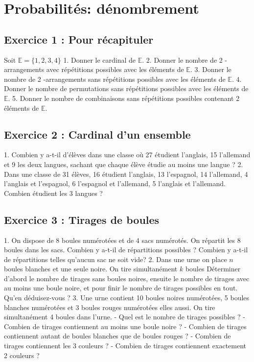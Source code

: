 \chapter{Probabilités: dénombrement}

\section*{Exercice 1 : Pour récapituler}

Soit \(\mathbb{E}=\{1,2,3,4\}\)
1. Donner le cardinal de \(\mathbb{E}\).
2. Donner le nombre de 2 -arrangements avec répétitions possibles avec les éléments de \(\mathbb{E}\).
3. Donner le nombre de 2 -arrangements sans répétitions possibles avec les éléments de \(\mathbb{E}\).
4. Donner le nombre de permutations sans répétitions possibles avec les éléments de \(\mathbb{E}\).
5. Donner le nombre de combinaisons sans répétitions possibles contenant 2 éléments de \(\mathbb{E}\).

\section*{Exercice 2 : Cardinal d'un ensemble}
1. Combien y a-t-il d'élèves dans une classe où 27 étudient l'anglais, 15 l'allemand et 9 les deux langues, sachant que chaque élève étudie au moins une langue ?
2. Dans une classe de 31 élèves, 16 étudient l'anglais, 13 l'espagnol, 14 l'allemand, 4 l'anglais et l'espagnol, 6 l'espagnol et l'allemand, 5 l'anglais et l'allemand. Combien étudient les 3 langues ?

\section*{Exercice 3 : Tirages de boules}
1. On dispose de 8 boules numérotées et de 4 sacs numérotés. On répartit les 8 boules dans les sacs. Combien y a-t-il de répartitions possibles ? Combien y a-t-il de répartitions telles qu'aucun sac ne soit vide?
2. Dans une urne on place \(n\) boules blanches et une seule noire. On tire simultanément \(k\) boules Déterminer d'abord le nombre de tirages sans boules noires, ensuite le nombre de tirages avec au moins une boule noire, et pour finir le nombre de tirages possibles en tout. Qu'en déduisez-vous ?
3. Une urne contient 10 boules noires numérotées, 5 boules blanches numérotées et 3 boules rouges numérotées elles aussi. On tire simultanément 4 boules dans l'urne.
- Quel est le nombre de tirages possibles ?
- Combien de tirages contiennent au moins une boule noire ?
- Combien de tirages contiennent autant de boules blanches que de boules rouges ?
- Combien de tirages contiennent les 3 couleurs ?
- Combien de tirages contiennent exactement 2 couleurs ?

